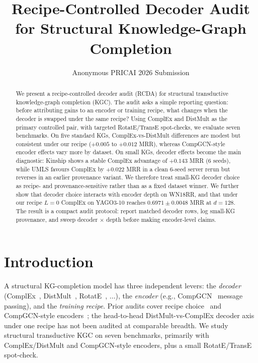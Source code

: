 \documentclass[runningheads]{llncs}
\title{Recipe-Controlled Decoder Audit for Structural Knowledge-Graph Completion}
\author{Anonymous PRICAI 2026 Submission}
\institute{}
\newcommand{\ours}{\textsc{RCDA}\xspace}
\begin{document}
\maketitle

\begin{abstract}
We present a recipe-controlled decoder audit (\ours) for structural transductive knowledge-graph completion (KGC). The audit asks a simple reporting question: before attributing gains to an encoder or training recipe, what changes when the decoder is swapped under the same recipe? Using ComplEx and DistMult as the primary controlled pair, with targeted RotatE/TransE spot-checks, we evaluate seven benchmarks. On five standard KGs, ComplEx-vs-DistMult differences are modest but consistent under our recipe ($+0.005$ to $+0.012$ MRR), whereas CompGCN-style encoder effects vary more by dataset. On small KGs, decoder effects become the main diagnostic: Kinship shows a stable ComplEx advantage of $+0.143$ MRR (6 seeds), while UMLS favours ComplEx by $+0.022$ MRR in a clean 6-seed server rerun but reverses in an earlier provenance variant. We therefore treat small-KG decoder choice as recipe- and provenance-sensitive rather than as a fixed dataset winner. We further show that decoder choice interacts with encoder depth on WN18RR, and that under our recipe $L{=}0$ ComplEx on YAGO3-10 reaches $0.6971 \pm 0.0048$ MRR at $d{=}128$. The result is a compact audit protocol: report matched decoder rows, log small-KG provenance, and sweep decoder $\times$ depth before making encoder-level claims.

\end{abstract}

\section{Introduction}
\label{sec:intro}

A structural KG-completion model has three independent levers: the \emph{decoder} (ComplEx~\cite{complex}, DistMult~\cite{distmult}, RotatE~\cite{rotate}, $\ldots$), the \emph{encoder} (e.g., CompGCN~\cite{compgcn} message passing), and the \emph{training recipe}. Prior audits cover recipe choice~\cite{ruffinelli2020olderboys} and CompGCN-style encoders~\cite{zhang2022rethinking}; the head-to-head DistMult-vs-ComplEx decoder axis under one recipe has not been audited at comparable breadth. We study structural transductive KGC on seven benchmarks, primarily with ComplEx/DistMult and CompGCN-style encoders, plus a small RotatE/TransE spot-check.
\end{document}
